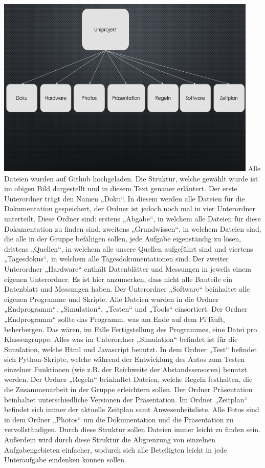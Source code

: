 \documentclass[notitlepage]{report}
\begin{document}
\includegraphics{Struktur.png}
Alle Dateien wurden auf Github hochgeladen. Die Struktur, welche gewählt wurde ist im obigen Bild dargestellt und in diesem Text genauer erläutert. 
Der erste Unterordner trägt den Namen „Doku“. In diesem werden alle Dateien für die Dokumentation gespeichert, der Ordner ist jedoch noch mal in vier Unterordner unterteilt. Diese Ordner sind: erstens „Abgabe“, in welchem alle Dateien für diese Dokumentation zu finden sind, zweitens „Grundwissen“, in welchem Dateien sind, die alle in der Gruppe befähigen sollen, jede Aufgabe eigenständig zu lösen, drittens „Quellen“, in welchem alle unsere Quellen aufgeführt sind und viertens „Tagesdokus“, in welchem alle Tagesdokumentationen sind.
Der zweiter Unterordner „Hardware“ enthält Datenblätter und Messungen in jeweils einem eigenen Unterordner. Es ist hier anzumerken, dass nicht alle Bauteile ein Datenblatt und Messungen haben.
Der Unterordner „Software“ beinhaltet alle eigenen Programme und Skripte. Alle Dateien wurden in die Ordner „Endprogramm“, „Simulation“, „Testen“ und „Tools“ einsortiert. Der Ordner „Endprogramm“ sollte das Programm, was am Ende auf dem Pi läuft, beherbergen. Das wären, im Falle Fertigstellung des Programmes, eine Datei pro Klassengruppe.  Alles was im Unterordner „Simulation“ befindet ist für die Simulation, welche Html und Javascript benutzt. In dem Ordner „Test“ befindet sich Python-Skripte, welche während der Entwicklung des Autos zum Testen einzelner Funktionen (wie z.B. der Reichweite der Abstandssensoren) benutzt werden.
Der Ordner „Regeln“ beinhaltet Dateien, welche Regeln festhalten, die die Zusammenarbeit in der Gruppe erleichtern sollen. Der Ordner Präsentation beinhaltet unterschiedliche Versionen der Präsentation. Im Ordner „Zeitplan“ befindet sich immer der aktuelle Zeitplan samt Anwesenheitsliste.  Alle Fotos sind in dem Ordner „Photos“ um die Dokumentation und die Präsentation zu vervollständigen. 
Durch diese Struktur sollen Dateien immer leicht zu finden sein. Außerdem wird durch diese Struktur die Abgrenzung von einzelnen Aufgabengebieten einfacher, wodurch sich alle Beteiligten leicht in jede Unteraufgabe eindenken können sollen. 
\end{document}
